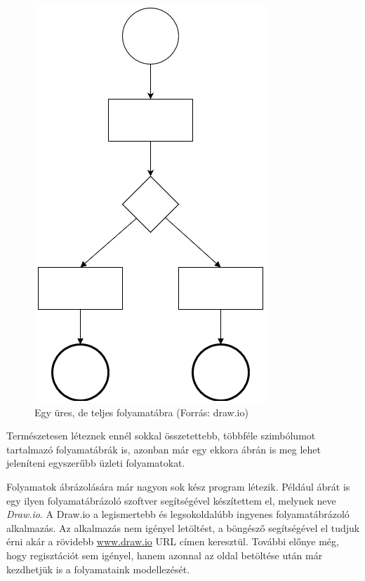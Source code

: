 \begin{figure}[h]
\centering
\includegraphics[scale=0.8]{images/uresfolyamat.png}
\caption{Egy üres, de teljes folyamatábra (Forrás: draw.io)}
\label{fig:uresfolyamat}
\end{figure}

Természetesen léteznek ennél sokkal összetettebb, többféle szimbólumot tartalmazó folyamatábrák is, azonban már egy ekkora ábrán is meg lehet jeleníteni egyszerűbb üzleti folyamatokat.



Folyamatok ábrázolására már nagyon sok kész program létezik. Például  ábrát is egy ilyen folyamatábrázoló szoftver segítségével készítettem el, melynek neve \textit{Draw.io}\cite{drawio}. A Draw.io a legismertebb és legsokoldalúbb ingyenes folyamatábrázoló alkalmazás. Az alkalmazás nem igényel letöltést, a böngésző segítségével el tudjuk érni akár a rövidebb \url{www.draw.io} URL címen keresztül. További előnye még, hogy regisztációt sem igényel, hanem azonnal az oldal betöltése után már kezdhetjük is a folyamataink modellezését.

